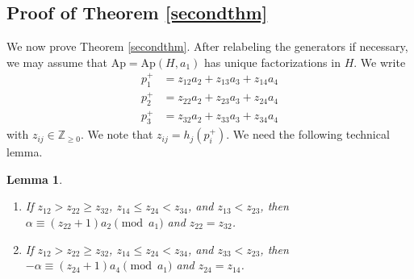 \documentclass[12pt]{amsart}
\numberwithin{equation}{section}
\newtheorem{lemma}[theorem]{Lemma}
\theoremstyle{definition}
\newcommand{\ZZ}{ \ensuremath{\mathbb{Z}}}
\newcommand{\Ap}{\mathrm{Ap}}
\begin{document}
\subsection*{Proof of Theorem \ref{secondthm}}
We now prove Theorem \ref{secondthm}.
After relabeling the generators if necessary, we may assume that
$\Ap=\Ap(H,a_1)$ has unique factorizations in $H$.
We write
\begin{align*}
p_1^+ &= z_{12}a_2+z_{13}a_3+z_{14}a_4\\
p_2^+ &= z_{22}a_2+z_{23}a_3+z_{24}a_4\\
p_3^+ &= z_{32}a_2+z_{33}a_3+z_{34}a_4
\end{align*}
with $z_{ij} \in \ZZ_{\geq 0}$.
We note that $z_{ij}=h_j(p_i^+)$.
We need the following technical lemma.

\begin{lemma}
\label{4.2}\ 
\begin{enumerate}
\item
If $z_{12}>z_{22}\geq z_{32}$, $z_{14}\leq z_{24}<z_{34}$, and $z_{13}<z_{23}$,
then
$\alpha\equiv (z_{22}+1)a_2\pmod {a_1}$ and $z_{22}=z_{32}$.
\item
If $z_{12}>z_{22}\geq z_{32}$, $z_{14}\leq z_{24}<z_{34}$, and $z_{33}<z_{23}$,
then
$-\alpha\equiv (z_{24}+1)a_4\pmod {a_1}$ and $z_{24}=z_{14}$.
\end{enumerate}
\end{lemma}
\end{document}
